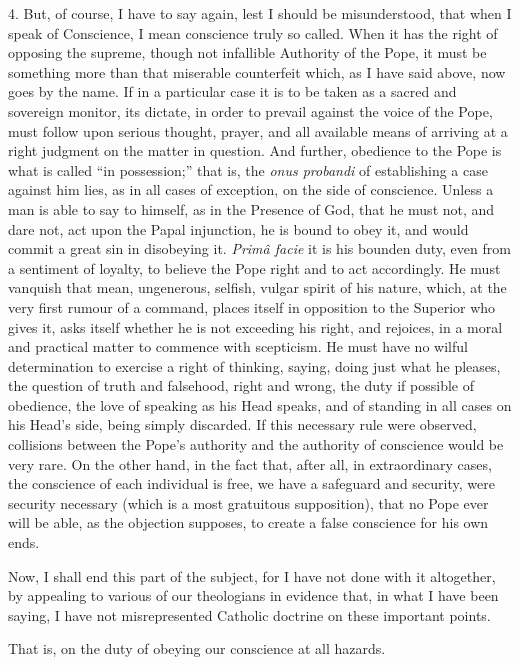 4. But, of course, I have to say again, lest I should be
misunderstood, that when I speak of Conscience, I mean conscience truly
so called. When it has the right of opposing the supreme, though not
infallible Authority of the Pope, it must be something more than that
miserable counterfeit which, as I have said above, now goes by the name.
If in a particular case it is to be taken as a sacred and sovereign
monitor, its dictate, in order to prevail against the voice of the Pope,
must follow upon serious thought, prayer, and all available means
of arriving at a right judgment on the matter in question. And further,
obedience to the Pope is what is called ``in possession;'' that
is, the \emph{onus probandi} of establishing a case against him lies, as
in all cases of exception, on the side of conscience. Unless a man is
able to say to himself, as in the Presence of God, that he must not, and
dare not, act upon the Papal injunction, he is bound to obey it, and
would commit a great sin in disobeying it. \emph{Primâ facie} it is his
bounden duty, even from a sentiment of loyalty, to believe the Pope
right and to act accordingly. He must vanquish that mean, ungenerous,
selfish, vulgar spirit of his nature, which, at the very first rumour of
a command, places itself in opposition to the Superior who gives it,
asks itself whether he is not exceeding his right, and rejoices, in a
moral and practical matter to commence with scepticism. He must have no
wilful determination to exercise a right of thinking, saying, doing just
what he pleases, the question of truth and falsehood, right and wrong,
the duty if possible of obedience, the love of speaking as his Head
speaks, and of standing in all cases on his Head's side, being simply
discarded. If this necessary rule were observed, collisions between the
Pope's authority and the authority of conscience would be very rare. On
the other hand, in the fact that, after all, in extraordinary cases, the
conscience of each individual is free, we have a safeguard and security,
were security necessary (which is a most gratuitous supposition), that
no Pope ever will be able, as the objection supposes, to create a false
conscience for his own ends.

Now, I shall end this part of the subject, for I have not done with
it altogether, by appealing to various of our theologians in evidence
that, in what I have been saying, I have not misrepresented Catholic
doctrine on these important points.

That is, on the duty of obeying our conscience at all hazards.

